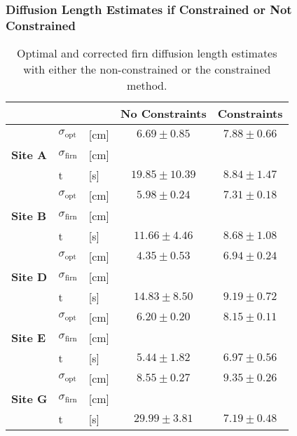 \documentclass[../../CompleteThesis2/Complete_2ndDraft]{subfiles}
\begin{document}
\subsubsection[$\sigma$ Constraints or No constraints]{Diffusion Length Estimates if Constrained or Not Constrained}
\label{Subsubsec:Results_DiffLenEst_AlphabetCores_ConstraintsVNoConstraints}
\begin{table}[ht]
	\centering
	\begin{tabular}{l l l | c | c}
		& & & No Constraints & Constraints\\
		\hline
		\hline 
		\multirow{3}{*}{\textbf{Site A}} & $\sigma_{\text{opt}}$ & [cm] & $6.69 \pm 0.85$ & $7.88 \pm 0.66$\\
		& $\sigma_{\text{firn}}$ & [cm] & & \\
		& t & [s] & $19.85\pm 10.39$ & $8.84\pm 1.47$ \\
		\hline
		
		\multirow{3}{*}{\textbf{Site B}} & $\sigma_{\text{opt}}$ & [cm] & $5.98 \pm 0.24$ & $7.31 \pm 0.18$ \\
		& $\sigma_{\text{firn}}$ & [cm] & & \\
		& t & [s] & $11.66 \pm 4.46$ & $8.68 \pm 1.08$\\
		\hline
		
		\multirow{3}{*}{\textbf{Site D}} & $\sigma_{\text{opt}}$ & [cm] & $4.35 \pm 0.53$ & $6.94 \pm 0.24$ \\
		& $\sigma_{\text{firn}}$ & [cm] & & \\
		& t & [s] & $14.83\pm 8.50$& $9.19 \pm 0.72$\\
		\hline
		
		\multirow{3}{*}{\textbf{Site E}} & $\sigma_{\text{opt}}$ & [cm] & $6.20 \pm 0.20$ & $8.15 \pm 0.11$ \\
		& $\sigma_{\text{firn}}$ & [cm] & & \\
		& t & [s] & $5.44 \pm 1.82$ & $6.97 \pm 0.56$\\
		\hline
		
		\multirow{3}{*}{\textbf{Site G}} & $\sigma_{\text{opt}}$ & [cm] & $8.55 \pm 0.27$ & $9.35 \pm 0.26$ \\
		& $\sigma_{\text{firn}}$ & [cm] & & \\
		& t & [s] & $29.99 \pm 3.81$ & $7.19 \pm 0.48$\\
		
		\hline
	\end{tabular}
	\caption[$\sigma$ Estimates Given Unconstrained and Constrained Method]{\small Optimal and corrected firn diffusion length estimates with either the non-constrained or the constrained method.}
\end{table}
\end{document}

